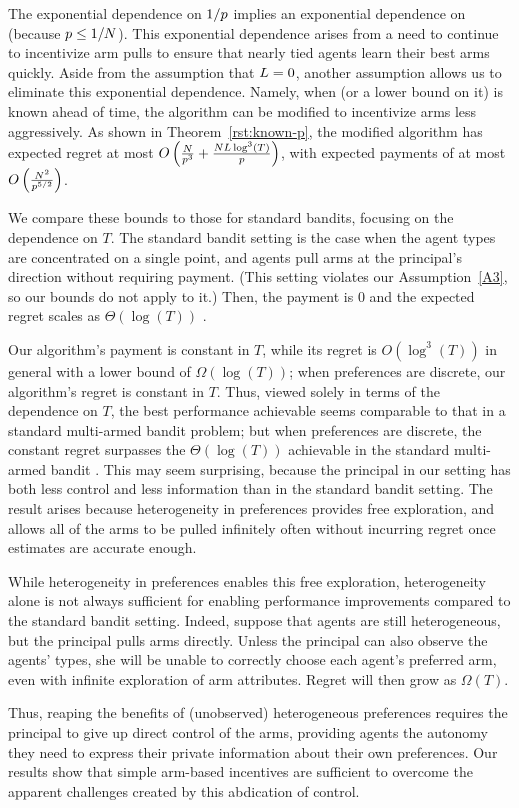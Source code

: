 The exponential dependence on $1/p$ implies an exponential
dependence on \ARMNUM (because $p \leq 1/N$).
This exponential dependence arises from a need to continue to
incentivize arm pulls to ensure that nearly tied agents learn their
best arms quickly.
Aside from the assumption that $L = 0$, another assumption
allows us to eliminate this exponential dependence.
Namely, when \MinProb (or a lower bound on it) is known ahead of time,
the algorithm can be modified to incentivize arms less aggressively.
As shown in Theorem~\ref{rst:known-p},
the modified algorithm has expected regret at most
$O \left(\frac{N}{p^3}
+\frac{N L \log^3(T)}{p} \right)$,
with expected payments of at most
$O \left(\frac{N^2}{p^{5/2}} \right)$.

We compare these bounds to those for standard bandits,
focusing on the dependence on $T$.  
The standard bandit setting is the case when the agent types \AgV
are concentrated on a single point, and agents pull arms at the
principal's direction without requiring payment.
(This setting violates our Assumption~\ref{A3},
so our bounds do not apply to it.)
Then, the payment is $0$ and the expected regret scales as
$\Theta(\log(T))$ \cite[Theorem 2.1]{bubeck2012regret}.

Our algorithm's payment is constant in $T$,
while its regret is $O(\log^3(T))$ in general with a lower bound of
$\Omega(\log(T))$;
when preferences are discrete, our algorithm's regret is
constant in $T$.
Thus, viewed solely in terms of the dependence on $T$,
the best performance achievable seems comparable to that in a standard
multi-armed bandit problem;
but when preferences are discrete, the constant regret
surpasses the $\Theta(\log(T))$ achievable in the standard multi-armed
bandit .
This may seem surprising, because the principal in our setting has
both less control and less information than in the standard bandit setting.
The result arises because heterogeneity in preferences provides
free exploration, and allows all of the arms to be pulled infinitely
often without incurring regret once estimates are accurate enough.

While heterogeneity in preferences enables this free exploration,
heterogeneity alone is not always sufficient for enabling performance
improvements compared to the standard bandit setting.
Indeed, suppose that agents are still heterogeneous,
but the principal pulls arms directly.
Unless the principal can also observe the agents' types,
she will be unable to correctly choose each agent's preferred arm,
even with infinite exploration of arm attributes.
Regret will then grow as $\Omega(T)$. 

Thus, reaping the benefits of (unobserved) heterogeneous preferences
requires the principal to give up direct control of the arms,
providing agents the autonomy they need to express their private
information about their own preferences.
Our results show that simple arm-based incentives are sufficient
to overcome the apparent challenges created by this abdication of
control.
